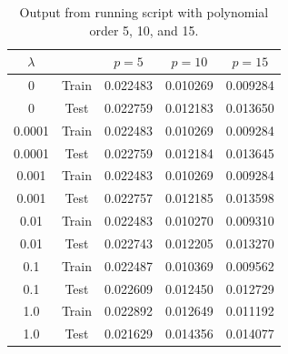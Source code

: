 \documentclass[english,notitlepage]{revtex4-1}  %
\begin{document}
\begin{table}[H]
    \centering
    \caption{Output from running script with polynomial order 5, 10, and 15.}
    \begin{tabular}{|c|c|c|c|c|}
        \hline
        $\lambda$ &  & $p=5$ & $p=10$ & $p=15$ \\ [0.5ex]
        \hline
        0 & Train & 0.022483 & 0.010269 & 0.009284 \\
        0 & Test & 0.022759 & 0.012183 & 0.013650 \\
        0.0001 & Train & 0.022483 & 0.010269 & 0.009284 \\
        0.0001 & Test & 0.022759 & 0.012184 & 0.013645 \\
        0.001 & Train & 0.022483 & 0.010269 & 0.009284 \\
        0.001 & Test & 0.022757 & 0.012185 & 0.013598 \\
        0.01 & Train & 0.022483 & 0.010270 & 0.009310 \\
        0.01 & Test & 0.022743 & 0.012205 & 0.013270 \\
        0.1 & Train & 0.022487 & 0.010369 & 0.009562 \\
        0.1 & Test & 0.022609 & 0.012450 & 0.012729 \\
        1.0 & Train & 0.022892 & 0.012649 & 0.011192 \\
        1.0 & Test & 0.021629 & 0.014356 & 0.014077 \\
        \hline
    \end{tabular}\label{tab:output_table}
\end{table}
\end{document}

